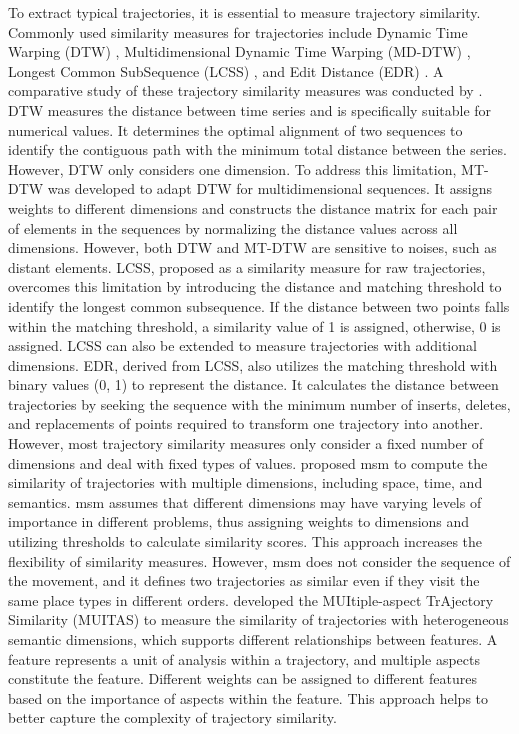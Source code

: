 \documentclass{article}
\theoremstyle{remark}
\begin{document}
To extract typical trajectories, it is essential to measure trajectory similarity. Commonly used similarity measures for trajectories include Dynamic Time Warping (DTW) \citep{berndt_using_1994}, Multidimensional Dynamic Time Warping (MD-DTW) \citep{ten_holt_multi-dimensional_2007}, Longest Common SubSequence (LCSS) \citep{vlachos_discovering_2002}, and Edit Distance (EDR) \citep{chen_robust_2005}. A comparative study of these trajectory similarity measures was conducted by \cite{tao_comparative_2021}. DTW measures the distance between time series and is specifically suitable for numerical values. It determines the optimal alignment of two sequences to identify the contiguous path with the minimum total distance between the series. However, DTW only considers one dimension. To address this limitation, MT-DTW was developed to adapt DTW for multidimensional sequences. It assigns weights to different dimensions and constructs the distance matrix for each pair of elements in the sequences by normalizing the distance values across all dimensions. However, both DTW and MT-DTW are sensitive to noises, such as distant elements. LCSS, proposed as a similarity measure for raw trajectories, overcomes this limitation by introducing the distance and matching threshold to identify the longest common subsequence. If the distance between two points falls within the matching threshold, a similarity value of 1 is assigned, otherwise, 0 is assigned. LCSS can also be extended to measure trajectories with additional dimensions. EDR, derived from LCSS, also utilizes the matching threshold with binary values (0, 1) to represent the distance. It calculates the distance between trajectories by seeking the sequence with the minimum number of inserts, deletes, and replacements of points required to transform one trajectory into another. However, most trajectory similarity measures only consider a fixed number of dimensions and deal with fixed types of values. \cite{furtado_multidimensional_2016} proposed \acrfull{msm} to compute the similarity of trajectories with multiple dimensions, including space, time, and semantics. \acrshort{msm} assumes that different dimensions may have varying levels of importance in different problems, thus assigning weights to dimensions and utilizing thresholds to calculate similarity scores. This approach increases the flexibility of similarity measures. However, \acrshort{msm} does not consider the sequence of the movement, and it defines two trajectories as similar even if they visit the same place types in different orders. \cite{petry_towards_2019} developed the MUItiple-aspect TrAjectory Similarity (MUITAS) to measure the similarity of trajectories with heterogeneous semantic dimensions, which supports different relationships between features. A feature represents a unit of analysis within a trajectory, and multiple aspects constitute the feature. Different weights can be assigned to different features based on the importance of aspects within the feature. This approach helps to better capture the complexity of trajectory similarity.
\end{document}
